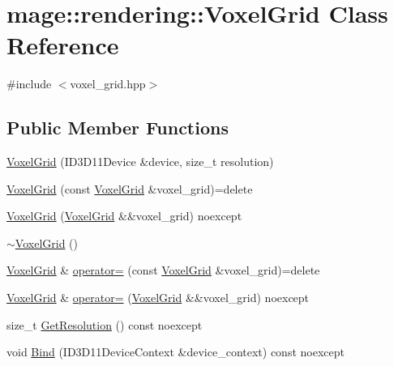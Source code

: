 \hypertarget{classmage_1_1rendering_1_1_voxel_grid}{}\section{mage\+:\+:rendering\+:\+:Voxel\+Grid Class Reference}
\label{classmage_1_1rendering_1_1_voxel_grid}


{\ttfamily \#include $<$voxel\+\_\+grid.\+hpp$>$}

\subsection*{Public Member Functions}
\begin{DoxyCompactItemize}
\item 
\hyperlink{classmage_1_1rendering_1_1_voxel_grid_aec475857836dbf56d99f30a9d8f70272}{Voxel\+Grid} (I\+D3\+D11\+Device \&device, size\+\_\+t resolution)
\item 
\hyperlink{classmage_1_1rendering_1_1_voxel_grid_ace9aac1356e41996630c6247ece48417}{Voxel\+Grid} (const \hyperlink{classmage_1_1rendering_1_1_voxel_grid}{Voxel\+Grid} \&voxel\+\_\+grid)=delete
\item 
\hyperlink{classmage_1_1rendering_1_1_voxel_grid_a985cc9f8fbe4e49adf2b61de2b348125}{Voxel\+Grid} (\hyperlink{classmage_1_1rendering_1_1_voxel_grid}{Voxel\+Grid} \&\&voxel\+\_\+grid) noexcept
\item 
\hyperlink{classmage_1_1rendering_1_1_voxel_grid_aa349c9ddd6d6be9f12d7e399a0931f89}{$\sim$\+Voxel\+Grid} ()
\item 
\hyperlink{classmage_1_1rendering_1_1_voxel_grid}{Voxel\+Grid} \& \hyperlink{classmage_1_1rendering_1_1_voxel_grid_a90b94d3a00e365e1a03d1077a5c79a11}{operator=} (const \hyperlink{classmage_1_1rendering_1_1_voxel_grid}{Voxel\+Grid} \&voxel\+\_\+grid)=delete
\item 
\hyperlink{classmage_1_1rendering_1_1_voxel_grid}{Voxel\+Grid} \& \hyperlink{classmage_1_1rendering_1_1_voxel_grid_a9e0ae3de8c583879a3db8b6d787138ac}{operator=} (\hyperlink{classmage_1_1rendering_1_1_voxel_grid}{Voxel\+Grid} \&\&voxel\+\_\+grid) noexcept
\item 
size\+\_\+t \hyperlink{classmage_1_1rendering_1_1_voxel_grid_ab38b97d6f567f2f44fa000a6bb9f305c}{Get\+Resolution} () const noexcept
\item 
void \hyperlink{classmage_1_1rendering_1_1_voxel_grid_ade7ea8a797334ceb16d55a3d1d83299a}{Bind} (I\+D3\+D11\+Device\+Context \&device\+\_\+context) const noexcept

\end{DoxyCompactItemize}
